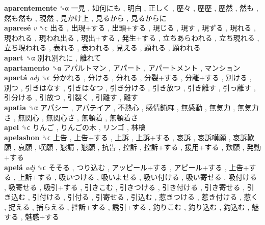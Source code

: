 \textbf{aparentemente} ␝α   一見 ,  如何にも ,  明白 ,  正しく ,  歴々 ,  歴歴 ,  歴然 ,  然も ,  然も然も ,  現然 ,  見かけ上 ,  見るから ,  見るからに   \\
\textbf{aparesé} \emph{v}  ␝ϲ   出る ,  出現+する ,  出頭+する ,  現じる ,  現す ,  現ずる ,  現れる ,  現われる ,  現われ出る ,  現出+する ,  発生+する ,  立ちあらわれる ,  立ち現れる ,  立ち現われる ,  表れる ,  表われる ,  見える ,  顕れる ,  顕われる   \\
\textbf{apart} ␝α   別れ別れに ,  離れて   \\
\textbf{apartamento} ␝α   アパルトマン ,  アパート ,  アパートメント ,  マンション   \\
\textbf{apartá} \emph{adj}  ␝ϲ   分かれる ,  分ける ,  分れる ,  分裂+する ,  分離+する ,  別ける ,  別つ ,  引きはなす ,  引きはなつ ,  引き分ける ,  引き放つ ,  引き離す ,  引っ離す ,  引分ける ,  引放つ ,  引裂く ,  引離す ,  離す   \\
\textbf{apatia} ␝α   アパシー ,  アパテイア ,  不熱心 ,  感情鈍麻 ,  無感動 ,  無気力 ,  無気力さ ,  無関心 ,  無関心さ ,  無頓着 ,  無頓着さ   \\
\textbf{apel} ␝ϲ   りんご ,  りんごの木 ,  リンゴ ,  林檎   \\
\textbf{apelashon} ␝ϲ   上告 ,  上告+する ,  上訴 ,  上訴+する ,  哀訴 ,  哀訴嘆願 ,  哀訴歎願 ,  哀願 ,  嘆願 ,  懇請 ,  懇願 ,  抗告 ,  控訴 ,  控訴+する ,  援用+する ,  歎願 ,  発動+する   \\
\textbf{apelá} \emph{adj}  ␝ϲ   そそる ,  つり込む ,  アッピール+する ,  アピール+する ,  上告+する ,  上訴+する ,  吸いつける ,  吸いよせる ,  吸い付ける ,  吸い寄せる ,  吸付ける ,  吸寄せる ,  吸引+する ,  引きこむ ,  引きつける ,  引き付ける ,  引き寄せる ,  引き込む ,  引付ける ,  引付る ,  引寄せる ,  引込む ,  惹きつける ,  惹き付ける ,  惹く ,  捉える ,  捕らえる ,  控訴+する ,  誘引+する ,  釣りこむ ,  釣り込む ,  釣込む ,  魅する ,  魅惑+する   \\

